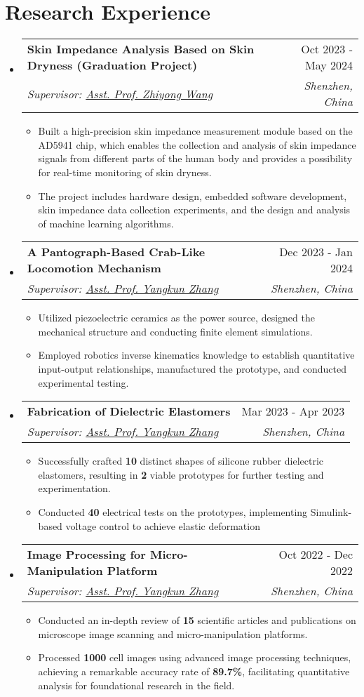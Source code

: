 \documentclass[letterpaper,11pt]{article}
\makeatletter
\newcommand{\resumeItem}[1]{
  \item\small{
    {#1 \vspace{-2pt}}
  }
}
\newcommand{\resumeSubheading}[4]{
  \vspace{-2pt}\item
    \begin{tabular*}{0.97\textwidth}[t]{l@{\extracolsep{\fill}}r}
      \textbf{#1} & #2 \\
      \textit{\small#3} & \textit{\small #4} \\
    \end{tabular*}\vspace{-7pt}
}
\newcommand{\resumeSubHeadingListStart}{\begin{itemize}[leftmargin=0.15in, label={}]}
\newcommand{\resumeSubHeadingListEnd}{\end{itemize}}
\newcommand{\resumeItemListStart}{\begin{itemize}}
\newcommand{\resumeItemListEnd}{\end{itemize}\vspace{-5pt}}
\makeatother
\begin{document}
\section{Research Experience}
  \resumeSubHeadingListStart    
  \resumeSubheading
      {Skin Impedance Analysis Based on Skin Dryness (Graduation Project)}{Oct 2023 - May 2024}
       {Supervisor: \href{https://faculty.hitsz.edu.cn/wangzhiyong}{Asst. Prof. Zhiyong Wang}}{Shenzhen, China}
      \resumeItemListStart
        \resumeItem{Built a high-precision skin impedance measurement module based on the AD5941 chip, which enables the collection and analysis of skin impedance signals from different parts of the human body and provides a possibility for real-time monitoring of skin dryness.}
        \resumeItem{The project includes hardware design, embedded software development, skin impedance data collection experiments, and the design and analysis of machine learning algorithms.}
      \resumeItemListEnd
  \resumeSubheading 
      {A Pantograph-Based Crab-Like Locomotion Mechanism}{Dec 2023 - Jan 2024}
      {Supervisor: \href{https://faculty.hitsz.edu.cn/zhangyangkun}{Asst. Prof. Yangkun Zhang}}{Shenzhen, China}
      \resumeItemListStart
        \resumeItem{Utilized piezoelectric ceramics as the power source, designed the mechanical structure and conducting finite element simulations. }
        \resumeItem{Employed robotics inverse kinematics knowledge to establish quantitative input-output relationships, manufactured the prototype, and conducted experimental testing. }
      \resumeItemListEnd
    \resumeSubheading
      {Fabrication of Dielectric Elastomers}{Mar 2023 - Apr 2023}
      {Supervisor: \href{https://faculty.hitsz.edu.cn/zhangyangkun}{Asst. Prof. Yangkun Zhang}}{Shenzhen, China}
      \resumeItemListStart
        \resumeItem{Successfully crafted \textbf{10} distinct shapes of silicone rubber dielectric elastomers, resulting in \textbf{2} viable prototypes for further testing and experimentation.}
        \resumeItem{Conducted \textbf{40} electrical tests on the prototypes, implementing Simulink-based voltage control to achieve elastic deformation }
      \resumeItemListEnd
    \resumeSubheading
      {Image Processing for Micro-Manipulation Platform}{Oct 2022 - Dec 2022}
      {Supervisor: \href{https://faculty.hitsz.edu.cn/zhangyangkun}{Asst. Prof. Yangkun Zhang}}{Shenzhen, China}
      \resumeItemListStart
        \resumeItem{Conducted an in-depth review of \textbf{15} scientific articles and publications on microscope image scanning and micro-manipulation platforms.}
        \resumeItem{Processed \textbf{1000} cell images using advanced image processing techniques, achieving a remarkable accuracy rate of \textbf{89.7\%}, facilitating quantitative analysis for foundational research in the field. }
      \resumeItemListEnd
  \resumeSubHeadingListEnd
\end{document}
